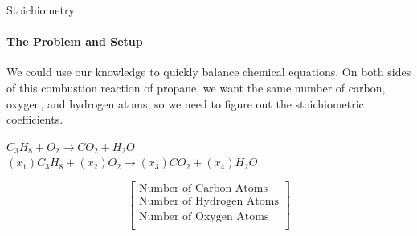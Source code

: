 \documentclass{beamer}
\begin{document}
\begin{frame}{Stoichiometry}
\framesubtitle{The Problem and Setup}
We could use our knowledge to quickly balance chemical equations. On both sides of this combustion reaction of propane, we want the same number of carbon, oxygen, and hydrogen atoms, so we need to figure out the stoichiometric coefficients.

{\tiny 
\begin{center}
    \(C_3H_8 + O_2 \xrightarrow{} CO_2 + H_2O\)  \\
    \((x_1)C_3H_8 + (x_2)O_2 \xrightarrow{} (x_3)CO_2 + (x_4)H_2O\)
\end{center}

\[
\begin{bmatrix}
    \text{Number of Carbon Atoms} \\
    \text{Number of Hydrogen Atoms} \\
    \text{Number of Oxygen Atoms} \\
\end{bmatrix}
\]

}
\end{frame}
\end{document}
